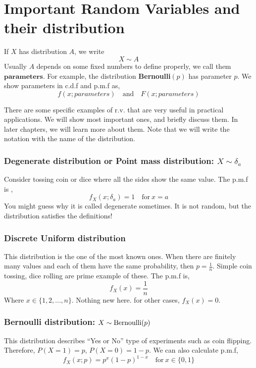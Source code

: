 

\section{Important Random Variables and their distribution}
\begin{definition}
    If $X$ has distribution $A$, we write
    \[ X \sim A\]
    Usually $A$ depends on some fixed numbers to define properly, we call them $\textbf{parameters}$. For example, the distribution \textbf{Bernoulli}$(p)$ has parameter $p$. We show parameters in c.d.f and p.m.f as,
    \[ f(x; parameters) \quad \text{and} \quad F(x; parameters) \]
    
\end{definition}
There are some specific examples of r.v. that are very useful in practical applications. We will show most important ones, and briefly discuss them. In later chapters, we will learn more about them. Note that we will write the notation with the name of the distribution.

\subsubsection{Degenerate distribution or Point mass distribution: $X \sim \delta_a$}
Consider tossing coin or dice where all the sides show the same value. The p.m.f is ,
\[f_X(x; \delta_a) = 1 \quad \text{for} \ x = a\]
You might guess why it is called degenerate sometimes. It is not random, but the distribution satisfies the definitions!
\subsubsection{Discrete Uniform distribution}
This distribution is the one of the most known ones. When there are finitely many values and each of them have the same probability, then $p = \frac{1}{n}$. Simple coin tossing, dice rolling are prime example of these. The p.m.f is,
\[f_X(x) = \frac{1}{n}\]
Where $x \in \{1,2,...,n \}$. Nothing new here.
for other cases, $f_X(x) = 0$. 
\subsubsection*{Bernoulli distribution: $X \sim \operatorname{Bernoulli}(p)$ }
This distribution describes ``Yes or No'' type of experiments such as coin flipping. Therefore, $P(X = 1) = p$, $P(X = 0) = 1-p$. We can also calculate p.m.f,
\[f_X(x; p) = p^x(1-p)^{1-x} \quad \text{for} \ x \in \{0,1\}\]

